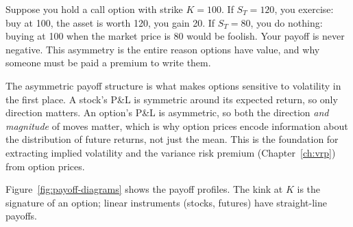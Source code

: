 \begin{intuition}
Suppose you hold a call option with strike $K = 100$.
If $S_T = 120$, you exercise: buy at 100, the asset is worth 120, you gain 20.
If $S_T = 80$, you do nothing: buying at 100 when the market price is 80 would be foolish.
Your payoff is never negative.
This asymmetry is the entire reason options have value, and why someone must be paid a premium to write them.
\end{intuition}

\begin{projectconnection}
The asymmetric payoff structure is what makes options sensitive to volatility in the first place.
A stock's P\&L is symmetric around its expected return, so only direction matters.
An option's P\&L is asymmetric, so both the direction \emph{and magnitude} of moves matter, which is why option prices encode information about the distribution of future returns, not just the mean.
This is the foundation for extracting implied volatility and the variance risk premium (Chapter~\ref{ch:vrp}) from option prices.
\end{projectconnection}

Figure~\ref{fig:payoff-diagrams} shows the payoff profiles.
The kink at $K$ is the signature of an option; linear instruments (stocks, futures) have straight-line payoffs.

